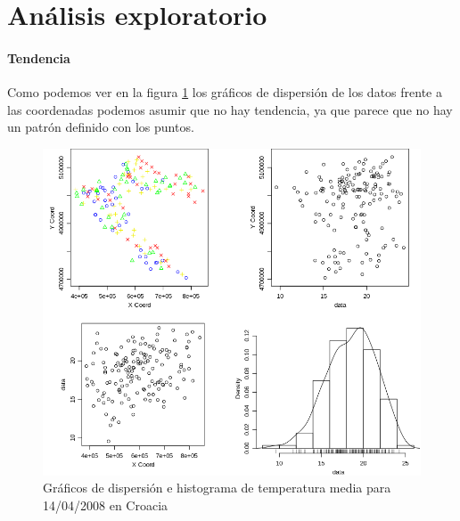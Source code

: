 \section{Análisis exploratorio}

\paragraph{Tendencia}
Como podemos ver en la figura \ref{ea_plot} los gráficos de dispersión de los datos frente a las coordenadas podemos asumir que no hay tendencia, ya que parece que no hay un patrón definido con los puntos.  

\begin{figure}
    \centering
    \includegraphics[scale=0.4]{geoestadistica/proyectos/proyecto_geoestadistica_croacia/images/ae_plot.png}
    \caption{Gráficos de dispersión e histograma de temperatura media para 14/04/2008 en Croacia }
    \label{ea_plot}
\end{figure}


